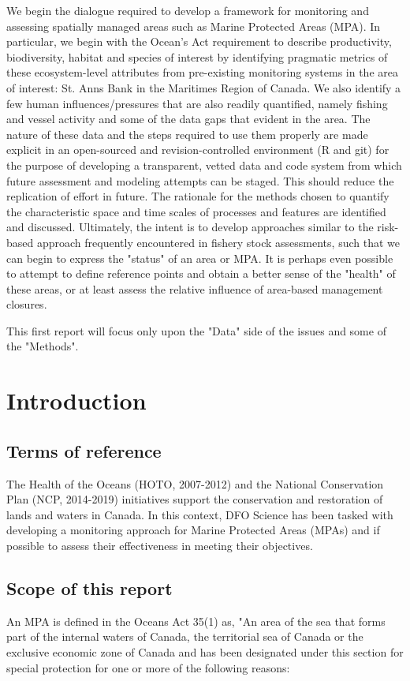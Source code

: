 \documentclass[letterpaper,portrait,11pt]{scrartcl}
\numberwithin{equation}{section}		%
\numberwithin{figure}{section}		%
\numberwithin{table}{section}				%
\begin{document}
We begin the dialogue required to develop a framework for monitoring and assessing spatially managed areas such as Marine Protected Areas (MPA). In particular, we begin with the Ocean's Act requirement to describe productivity, biodiversity, habitat and species of interest by identifying pragmatic metrics of these ecosystem-level attributes from pre-existing monitoring systems in the area of interest: St. Anns Bank in the Maritimes Region of Canada. We also identify a few human influences/pressures that are also readily quantified, namely fishing and vessel activity and some of the data gaps that evident in the area. The nature of these data and the steps required to use them properly are made explicit in an open-sourced and revision-controlled environment (R and git) for the purpose of developing a transparent, vetted data and code system from which future assessment and modeling attempts can be staged. This should reduce the replication of effort in future. The rationale for the methods chosen to quantify the characteristic space and time scales of processes and features are identified and discussed. Ultimately, the intent is to develop approaches similar to the risk-based approach frequently encountered in fishery stock assessments, such that we can begin to express the "status" of an area or MPA. It is perhaps even possible to attempt to define reference points and obtain a better sense of the "health" of these areas, or at least assess the relative influence of area-based management closures. 

This first report will focus only upon the "Data" side of the issues and some of the "Methods". 


\section{Introduction}

\subsection{Terms of reference}
The Health of the Oceans (HOTO, 2007-2012) and the National Conservation Plan (NCP, 2014-2019) initiatives support the conservation and restoration of lands and waters in Canada. In this context, DFO Science has been tasked with developing a monitoring approach for Marine Protected Areas (MPAs) and if possible to assess their effectiveness in meeting their objectives. 

\subsection{Scope of this report}
An MPA is defined in the Oceans Act 35(1) as, "An area of the sea that forms part of the internal waters of Canada, the territorial sea of Canada or the exclusive economic zone of Canada and has been designated under this section for special protection for one or more of the following reasons: 
\end{document}
